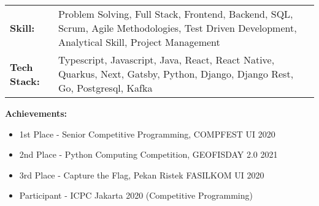 \documentclass[a4paper,10pt]{article}
\begin{document}
\begin{tabularx}{\textwidth}{@{}lX@{}}
\textbf{Skill:} & Problem Solving, Full Stack, Frontend, Backend, SQL, Scrum, Agile Methodologies, Test Driven Development, Analytical Skill, Project Management \\
\textbf{Tech Stack:} & Typescript, Javascript, Java, React, React Native, Quarkus, Next, Gatsby, Python, Django, Django Rest, Go, Postgresql, Kafka \\
\end{tabularx}
\textbf{Achievements:}
\begin{itemize}
    \item 1st Place - Senior Competitive Programming, COMPFEST UI 2020
    \item 2nd Place - Python Computing Competition, GEOFISDAY 2.0 2021
    \item 3rd Place - Capture the Flag, Pekan Ristek FASILKOM UI 2020
    \item Participant - ICPC Jakarta 2020 (Competitive Programming)
\end{itemize}
\end{document}
